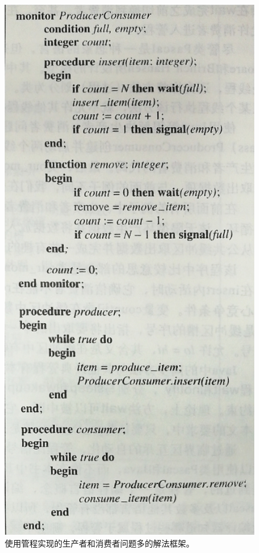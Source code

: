 \documentclass[UTF8,a4paper]{ctexart}
\begin{document}
\begin{figure}[H]\centering
	\includegraphics[scale = 0.3]{assets/ModernOperatingSystems_061b9.png}
	\caption{使用管程实现的生产者和消费者问题多的解法框架。}
\end{figure}
\end{document}
